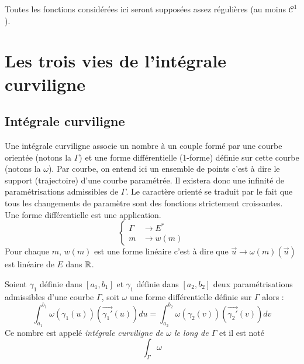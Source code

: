 

 Toutes les fonctions considérées ici seront supposées assez régulières (au moins $\mathcal C^1$). 

\section{Les trois vies de l'intégrale curviligne}
\subsection{Intégrale curviligne}
Une intégrale curviligne associe un nombre à un couple formé par une courbe orientée (notons la $\Gamma$) et une forme différentielle (1-forme) définie sur cette courbe (notons la $\omega$).\newline
Par courbe, on entend ici un ensemble de points c'est à dire le support (trajectoire) d'une courbe paramétrée. Il existera donc une infinité de paramétrisations admissibles de $\Gamma$. Le caractère orienté se traduit par le fait que tous les changements de paramètre sont des fonctions strictement croissantes.\newline
Une forme différentielle est une application.
\begin{displaymath}
 \left\lbrace 
\begin{aligned}
 \Gamma &\rightarrow E^* \\
 m &\rightarrow w(m)
\end{aligned}
\right. 
\end{displaymath}
Pour chaque $m$, $w(m)$ est une forme linéaire c'est à dire que  $\overrightarrow u \rightarrow \omega(m)(\overrightarrow u)$ est linéaire de $E$ dans $\mathbb{R}$.
\begin{prop}
 Soient $\gamma_1$ définie dans $[a_1,b_1]$ et $\gamma_1$ définie dans $[a_2,b_2]$ deux paramétrisations admissibles d'une courbe $\Gamma$, soit $\omega$ une forme différentielle définie sur $\Gamma$ alors :
\begin{displaymath}
 \int_{a_1}^{b_1}\omega(\gamma_1(u))(\overrightarrow{\gamma_1 '}(u))du 
=
 \int_{a_2}^{b_2}\omega(\gamma_2(v))(\overrightarrow{\gamma_2 '}(v))dv 
\end{displaymath}
Ce nombre est appelé \emph{intégrale curviligne de $\omega$ le long de $\Gamma$} et il est noté
\begin{displaymath}
 \int_\Gamma \omega
\end{displaymath}
\end{prop}
